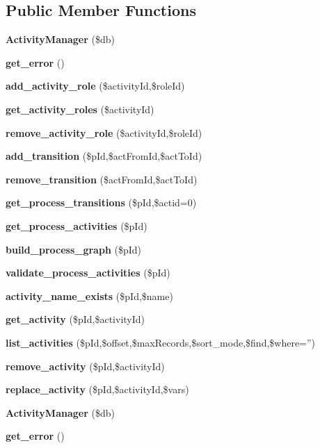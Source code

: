 \subsection*{Public Member Functions}
\begin{CompactItemize}
\item 
{\bf Activity\-Manager} (\$db)
\item 
{}
{\bf get\_\-error} ()\label{classActivityManager_a1}

\item 
{\bf add\_\-activity\_\-role} (\$activity\-Id,\$role\-Id)
\item 
{\bf get\_\-activity\_\-roles} (\$activity\-Id)
\item 
{\bf remove\_\-activity\_\-role} (\$activity\-Id,\$role\-Id)
\item 
{\bf add\_\-transition} (\$p\-Id,\$act\-From\-Id,\$act\-To\-Id)
\item 
{\bf remove\_\-transition} (\$act\-From\-Id,\$act\-To\-Id)
\item 
{\bf get\_\-process\_\-transitions} (\$p\-Id,\$actid=0)
\item 
{\bf get\_\-process\_\-activities} (\$p\-Id)
\item 
{\bf build\_\-process\_\-graph} (\$p\-Id)
\item 
{\bf validate\_\-process\_\-activities} (\$p\-Id)
\item 
{\bf activity\_\-name\_\-exists} (\$p\-Id,\$name)
\item 
{\bf get\_\-activity} (\$p\-Id,\$activity\-Id)
\item 
{\bf list\_\-activities} (\$p\-Id,\$offset,\$max\-Records,\$sort\_\-mode,\$find,\$where='')
\item 
{\bf remove\_\-activity} (\$p\-Id,\$activity\-Id)
\item 
{\bf replace\_\-activity} (\$p\-Id,\$activity\-Id,\$vars)
\item 
{\bf Activity\-Manager} (\$db)
\item 
{}
{\bf get\_\-error} ()\label{classActivityManager_a17}


\end{CompactItemize}
